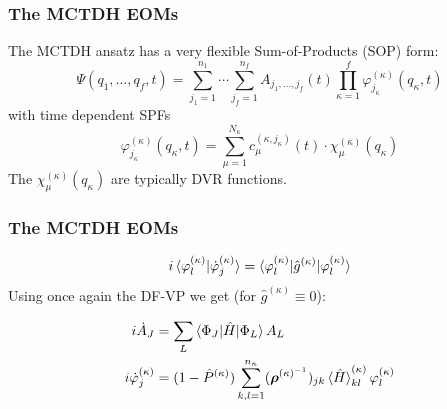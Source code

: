 \documentclass{beamer}
\begin{document}
\begin{frame}
  \frametitle{The MCTDH EOMs}
  The MCTDH ansatz has a very flexible Sum-of-Products (SOP) form:
    \begin{equation}
      \Psi(q_1,\ldots, q_f, t) = \sum^{n_1}_{j_1=1}\cdots\sum^{n_f}_{j_f=1}A_{j_1,\ldots,j_f}(t)\prod^{f}_{\kappa=1}\varphi^{(\kappa)}_{j_{\kappa}}(q_{\kappa}, t)
    \end{equation}
    with time dependent SPFs
    \begin{equation}
      \label{spf}
	\varphi^{(\kappa)}_{j_{\kappa}}(q_{\kappa}, t) = \sum_{\mu=1}^{N_{\kappa}}c_{\mu}^{(\kappa, j_{\kappa})}(t)\cdot \chi^{(\kappa)}_{\mu}(q_{\kappa})
    \end{equation}
  The \(\chi^{(\kappa)}_{\mu}(q_{\kappa})\) are typically DVR functions.
  
\end{frame}

\begin{frame}
  \frametitle{The MCTDH EOMs}
\begin{equation}
	i\braket{\varphi^{(\kappa)}_l|\dot{\varphi}^{(\kappa)}_j} = \braket{\varphi^{(\kappa)}_l|\hat{g}^{(\kappa)}|\varphi^{(\kappa)}_l}
\end{equation}
Using once again the DF-VP we get (for \(\hat{g}^{(\kappa)} \equiv 0\)):

\begin{block}{}
\begin{align}
\begin{split}
i\dot{A}_J &= \sum_L \braket{\Phi_J|\hat{H}|\Phi_L}A_L \\
i\dot{\varphi}^{(\kappa)}_j &= (1 - \hat{P}^{(\kappa)})\sum_{k,l=1}^{n_{\kappa}}(\bm{\rho}^{(\kappa)^{-1}})_{jk}\braket{\hat{H}}_{kl}^{(\kappa)}\varphi^{(\kappa)}_l
\label{mctdh_eom}
\end{split}	
\end{align}
\end{block}
      
\end{frame}
\end{document}
